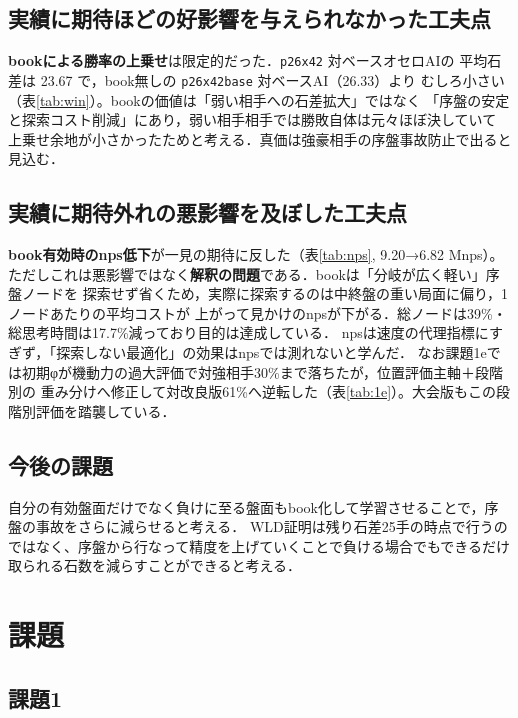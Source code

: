 \documentclass[11pt,a4j]{ujarticle} %
\begin{document}
\subsection{実績に期待ほどの好影響を与えられなかった工夫点}

\textbf{bookによる勝率の上乗せ}は限定的だった．{\verb+p26x42+} 対ベースオセロAIの
平均石差は 23.67 で，book無しの {\verb+p26x42base+} 対ベースAI（26.33）より
むしろ小さい（表\ref{tab:win}）。bookの価値は「弱い相手への石差拡大」ではなく
「序盤の安定と探索コスト削減」にあり，弱い相手相手では勝敗自体は元々ほぼ決していて
上乗せ余地が小さかったためと考える．真価は強豪相手の序盤事故防止で出ると見込む．

\subsection{実績に期待外れの悪影響を及ぼした工夫点}
\label{sec:bad}

\textbf{book有効時のnps低下}が一見の期待に反した（表\ref{tab:nps}, 9.20→6.82 Mnps）。
ただしこれは悪影響ではなく\textbf{解釈の問題}である．bookは「分岐が広く軽い」序盤ノードを
探索せず省くため，実際に探索するのは中終盤の重い局面に偏り，1ノードあたりの平均コストが
上がって見かけのnpsが下がる．総ノードは39\%・総思考時間は17.7\%減っており目的は達成している．
npsは速度の代理指標にすぎず，「探索しない最適化」の効果はnpsでは測れないと学んだ．
なお課題1eでは初期φが機動力の過大評価で対強相手30\%まで落ちたが，位置評価主軸＋段階別の
重み分けへ修正して対改良版61\%へ逆転した（表\ref{tab:1e}）。大会版もこの段階別評価を踏襲している．

\subsection{今後の課題}

自分の有効盤面だけでなく負けに至る盤面もbook化して学習させることで，序盤の事故をさらに減らせると考える．
WLD証明は残り石差25手の時点で行うのではなく、序盤から行なって精度を上げていくことで負ける場合でもできるだけ取られる石数を減らすことができると考える．

\section{課題}
\subsection{課題1}
\end{document}
